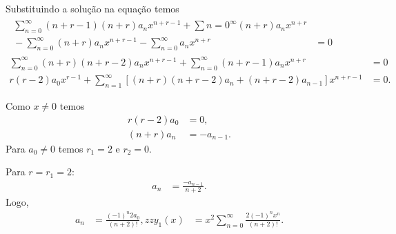 \documentclass[a4paper,12pt, leqno, answers]{exam}
\begin{document}
\begin{questions}
\begin{solution}
        Substituindo a solu\c{c}\~{a}o na equa\c{c}\~{a}o temos
        \begin{align*}
            \begin{split}
                \sum_{n = 0}^\infty \left( n + r - 1 \right) \left( n + r \right) a_n x^{n + r - 1} + \sum{n = 0}^\infty \left( n + r \right) a_n x^{n + r} \\ {}- \sum_{n = 0}^\infty \left( n + r \right) a_n x^{n + r - 1} - \sum_{n = 0}^\infty a_n x^{n + r} &= 0
            \end{split} \\
            \sum_{n = 0}^\infty \left( n + r \right) \left( n + r - 2 \right) a_n x^{n + r - 1} + \sum_{n = 0}^\infty \left( n + r - 1 \right) a_n x^{n + r} &= 0 \\
            r \left( r - 2 \right) a_0 x^{r - 1} + \sum_{n = 1}^\infty \left[ \left( n + r \right) \left( n + r - 2 \right) a_n + \left( n + r - 2 \right) a_{n - 1} \right] x^{n + r - 1} &= 0.
        \end{align*}

        Como $x \neq 0$ temos
        \begin{align*}
            r \left( r - 2 \right) a_0 &= 0, \\
            \left( n + r \right) a_n &= -a_{n - 1}.
        \end{align*}
        Para $a_0 \neq 0$ temos $r_1 = 2$ e $r_2 = 0$.

        Para $r = r_1 = 2$:
        \begin{align*}
            a_n &= \frac{- a_{n - 1}}{n + 2}.
        \end{align*}
        Logo,
        \begin{align*}
            a_n &= \frac{\left( -1 \right)^n 2 a_0}{\left( n + 2 \right)!}, zz
            y_1(x) &= x^2 \sum_{n = 0}^\infty \frac{2 \left( -1 \right)^n x^n}{\left( n + 2 \right)!}.
        \end{align*}


\end{solution}
\end{questions}
\end{document}
